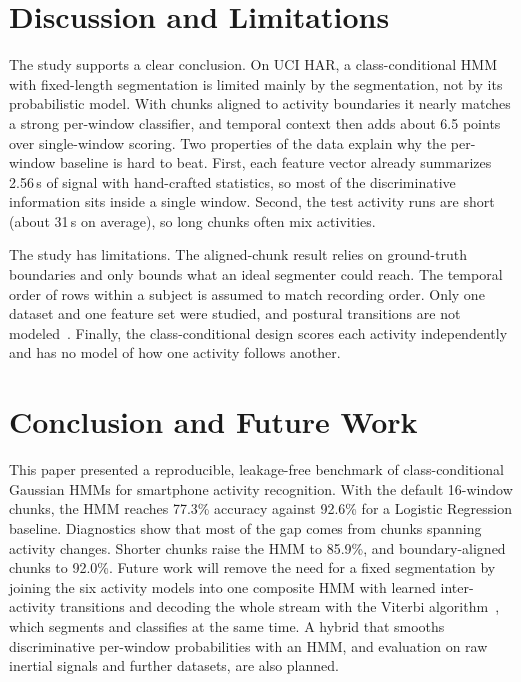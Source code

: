 \documentclass[conference]{IEEEtran}
\begin{document}
\section{Discussion and Limitations}
The study supports a clear conclusion. On UCI HAR, a class-conditional HMM with fixed-length segmentation is limited mainly by the segmentation, not by its probabilistic model. With chunks aligned to activity boundaries it nearly matches a strong per-window classifier, and temporal context then adds about 6.5 points over single-window scoring. Two properties of the data explain why the per-window baseline is hard to beat. First, each feature vector already summarizes 2.56\,s of signal with hand-crafted statistics, so most of the discriminative information sits inside a single window. Second, the test activity runs are short (about 31\,s on average), so long chunks often mix activities.

The study has limitations. The aligned-chunk result relies on ground-truth boundaries and only bounds what an ideal segmenter could reach. The temporal order of rows within a subject is assumed to match recording order. Only one dataset and one feature set were studied, and postural transitions are not modeled~\cite{reyesortiz2016transition}. Finally, the class-conditional design scores each activity independently and has no model of how one activity follows another.

\section{Conclusion and Future Work}
This paper presented a reproducible, leakage-free benchmark of class-conditional Gaussian HMMs for smartphone activity recognition. With the default 16-window chunks, the HMM reaches 77.3\% accuracy against 92.6\% for a Logistic Regression baseline. Diagnostics show that most of the gap comes from chunks spanning activity changes. Shorter chunks raise the HMM to 85.9\%, and boundary-aligned chunks to 92.0\%. Future work will remove the need for a fixed segmentation by joining the six activity models into one composite HMM with learned inter-activity transitions and decoding the whole stream with the Viterbi algorithm~\cite{viterbi1967error}, which segments and classifies at the same time. A hybrid that smooths discriminative per-window probabilities with an HMM, and evaluation on raw inertial signals and further datasets, are also planned.
\end{document}
